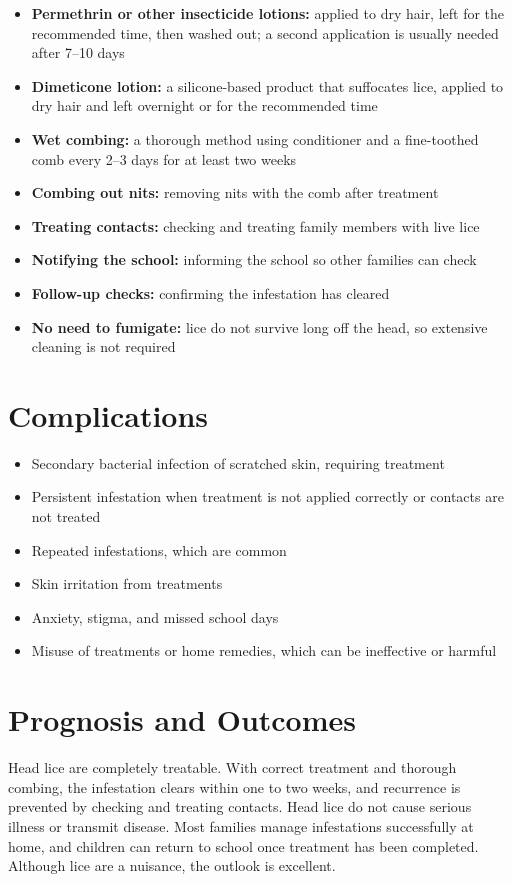 \begin{itemize}
    \item \textbf{Permethrin or other insecticide lotions:} applied to dry hair, left for the recommended time, then washed out; a second application is usually needed after 7--10 days
    \item \textbf{Dimeticone lotion:} a silicone-based product that suffocates lice, applied to dry hair and left overnight or for the recommended time
    \item \textbf{Wet combing:} a thorough method using conditioner and a fine-toothed comb every 2--3 days for at least two weeks
    \item \textbf{Combing out nits:} removing nits with the comb after treatment
    \item \textbf{Treating contacts:} checking and treating family members with live lice
    \item \textbf{Notifying the school:} informing the school so other families can check
    \item \textbf{Follow-up checks:} confirming the infestation has cleared
    \item \textbf{No need to fumigate:} lice do not survive long off the head, so extensive cleaning is not required
\end{itemize}

\section*{Complications}
\begin{itemize}
    \item Secondary bacterial infection of scratched skin, requiring treatment
    \item Persistent infestation when treatment is not applied correctly or contacts are not treated
    \item Repeated infestations, which are common
    \item Skin irritation from treatments
    \item Anxiety, stigma, and missed school days
    \item Misuse of treatments or home remedies, which can be ineffective or harmful
\end{itemize}

\section*{Prognosis and Outcomes}
Head lice are completely treatable. With correct treatment and thorough combing, the infestation clears within one to two weeks, and recurrence is prevented by checking and treating contacts. Head lice do not cause serious illness or transmit disease. Most families manage infestations successfully at home, and children can return to school once treatment has been completed. Although lice are a nuisance, the outlook is excellent.

